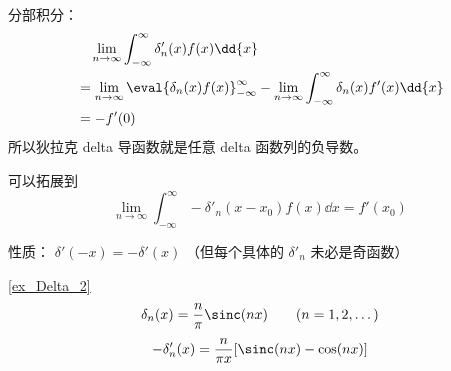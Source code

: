 
\begin{issues}
\issueDraft
\end{issues}


分部积分：
\begin{equation}
\begin{aligned}
&\quad \lim_{n\to\infty}\int_{-\infty}^\infty \delta'_n(x) f(x) \dd{x}\\
&= \lim_{n\to\infty}\eval{\delta_n(x) f(x)}_{-\infty}^\infty - \lim_{n\to\infty}\int_{-\infty}^\infty \delta_n(x) f'(x) \dd{x}\\
&= - f'(0)
\end{aligned}
\end{equation}
所以狄拉克 delta 导函数就是任意 delta 函数列的负导数。

可以拓展到
\begin{equation}
\lim_{n\to\infty}\int_{-\infty}^\infty -\delta'_n(x-x_0) f(x) \dd{x} = f'(x_0)
\end{equation}

性质： $\delta'(-x) = -\delta'(x)$ （但每个具体的 $\delta'_n$ 未必是奇函数）

\begin{example}{}
\autoref{ex_Delta_2}~
\begin{equation}
\delta_n(x) = \frac{n}{\pi}\sinc(n x) \qquad (n = 1, 2, \dots)
\end{equation}
\begin{equation}
-\delta'_n(x) = \frac{n}{\pi x} [\sinc(nx) - \cos(nx)]
\end{equation}
\end{example}
